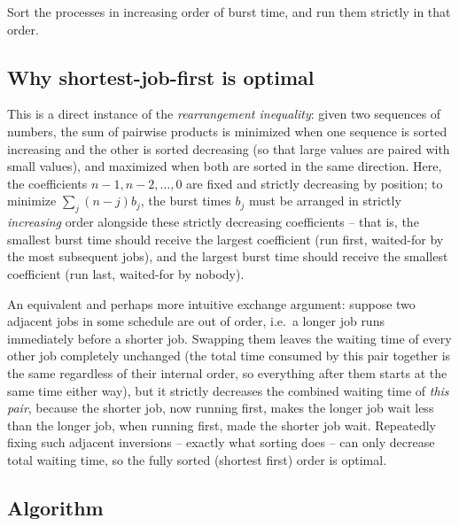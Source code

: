 \begin{ideabox}
Sort the processes in increasing order of burst time, and run them strictly
in that order.
\end{ideabox}

\subsection*{Why shortest-job-first is optimal}

This is a direct instance of the \emph{rearrangement inequality}: given two
sequences of numbers, the sum of pairwise products is minimized when one
sequence is sorted increasing and the other is sorted decreasing (so that
large values are paired with small values), and maximized when both are
sorted in the same direction. Here, the coefficients $n-1, n-2, \dots, 0$
are fixed and strictly decreasing by position; to minimize
$\sum_j (n-j) b_j$, the burst times $b_j$ must be arranged in strictly
\emph{increasing} order alongside these strictly decreasing coefficients --
that is, the smallest burst time should receive the largest coefficient
(run first, waited-for by the most subsequent jobs), and the largest burst
time should receive the smallest coefficient (run last, waited-for by
nobody).

An equivalent and perhaps more intuitive exchange argument: suppose two
adjacent jobs in some schedule are out of order, i.e.\ a longer job runs
immediately before a shorter job. Swapping them leaves the waiting time of
every other job completely unchanged (the total time consumed by this pair
together is the same regardless of their internal order, so everything
after them starts at the same time either way), but it strictly decreases
the combined waiting time of \emph{this pair}, because the shorter job, now
running first, makes the longer job wait less than the longer job, when
running first, made the shorter job wait. Repeatedly fixing such
adjacent inversions -- exactly what sorting does -- can only decrease total
waiting time, so the fully sorted (shortest first) order is optimal.

\subsection*{Algorithm}

